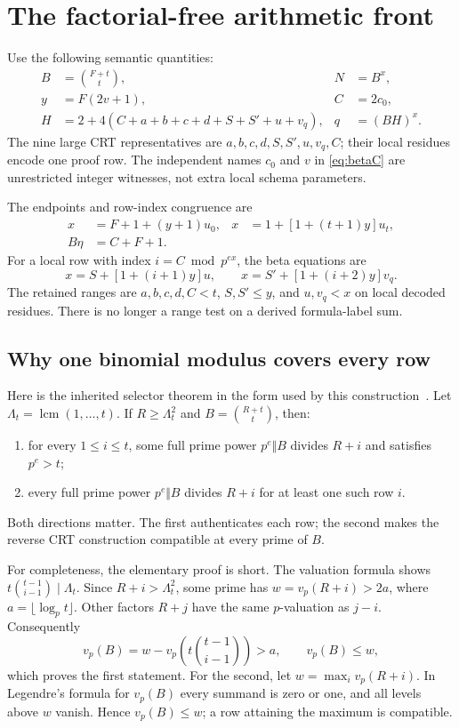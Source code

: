 \documentclass[11pt]{article}
\theoremstyle{definition}\newtheorem{remark}[theorem]{Remark}
\newcommand{\lcm}{\operatorname{lcm}}
\begin{document}
\section{The factorial-free arithmetic front}

Use the following semantic quantities:
\begin{align}
 B&=\binom{F+t}{t},& N&=B^x,\label{eq:BN}\\
 y&=F(2v+1),& C&=2c_0,\label{eq:betaC}\\
 H&=2+4(C+a+b+c+d+S+S'+u+v_q),&q&=(BH)^x.\label{eq:radix}
\end{align}
The nine large CRT representatives are
$a,b,c,d,S,S',u,v_q,C$; their local residues encode one proof row.
The independent names $c_0$ and $v$ in \eqref{eq:betaC} are unrestricted
integer witnesses, not extra local schema parameters.

The endpoints and row-index congruence are
\begin{align}
 x&=F+1+(y+1)u_0,
 &x&=1+[1+(t+1)y]u_t,\label{eq:endpoints}\\
 B\eta&=C+F+1.\label{eq:selector}
\end{align}
For a local row with index $i=C\bmod p^{ex}$, the beta equations are
\[
 x=S+[1+(i+1)y]u,\qquad
 x=S'+[1+(i+2)y]v_q.
\]
The retained ranges are $a,b,c,d,C<t$, $S,S'\le y$, and $u,v_q<x$
on local decoded residues. There is no longer a range test on a derived
formula-label sum.

\subsection{Why one binomial modulus covers every row}

Here is the inherited selector theorem in the form used by this
construction~\cite{factorialfree}. Let $\Lambda_t=\lcm(1,\ldots,t)$.
If $R\ge\Lambda_t^2$ and $B=\binom{R+t}{t}$, then:
\begin{enumerate}
\item for every $1\le i\le t$, some full prime power $p^e\Vert B$
      divides $R+i$ and satisfies $p^e>t$;
\item every full prime power $p^e\Vert B$ divides $R+i$ for at least one
      such row $i$.
\end{enumerate}
Both directions matter. The first authenticates each row; the second
makes the reverse CRT construction compatible at every prime of $B$.

For completeness, the elementary proof is short. The valuation formula
shows $t\binom{t-1}{i-1}\mid\Lambda_t$. Since $R+i>\Lambda_t^2$,
some prime has $w=v_p(R+i)>2a$, where
$a=\lfloor\log_p t\rfloor$. Other factors $R+j$ have the same
$p$-valuation as $j-i$. Consequently
\[
 v_p(B)=w-v_p\left(t\binom{t-1}{i-1}\right)>a,
 \qquad v_p(B)\le w,
\]
which proves the first statement. For the second, let
$w=\max_i v_p(R+i)$. In Legendre's formula for $v_p(B)$ every summand
is zero or one, and all levels above $w$ vanish. Hence $v_p(B)\le w$;
a row attaining the maximum is compatible.
\end{document}
